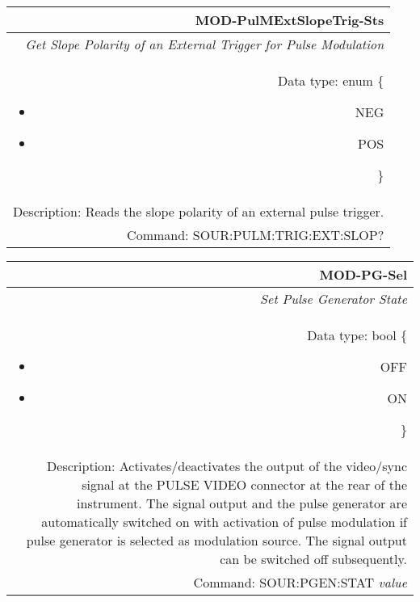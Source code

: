 \documentclass[openany]{article}
\begin{document}
		\begin{tabular}{N}
			\hline
			\bfseries MOD-PulMExtSlopeTrig-Sts \\ \hline
			\emph{Get Slope Polarity of an External Trigger for Pulse Modulation} \\
			Data type: enum \{\begin{itemize}[noitemsep]
				\small
				\item[] NEG
				\item[] POS
			\end{itemize}\} \\ 
			Description: Reads the slope polarity of an external pulse trigger. \\
			Command: SOUR:PULM:TRIG:EXT:SLOP? \\

		\end{tabular}
%
		\begin{tabular}{N}
			\hline
			\bfseries MOD-PG-Sel \\ \hline
			\emph{Set Pulse Generator State} \\
			Data type: bool \{\begin{itemize}[noitemsep]
				\small
				\item[] OFF
				\item[] ON
			\end{itemize}\} \\
			Description: Activates/deactivates the output of the video/sync signal at the PULSE VIDEO connector at the rear of the instrument. The signal output and the pulse generator are automatically switched on with activation of pulse modulation if pulse generator is selected as modulation source. The signal output can be switched off subsequently. \\
			Command: SOUR:PGEN:STAT \emph{value} \\

		\end{tabular}
\end{document}
